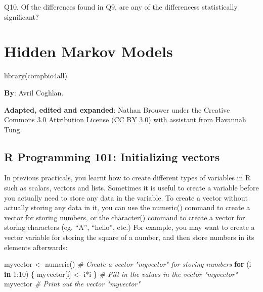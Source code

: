 \documentclass[
]{book}
\newenvironment{Shaded}{\begin{snugshade}}{\end{snugshade}}
\newcommand{\CommentTok}[1]{\textcolor[rgb]{0.56,0.35,0.01}{\textit{#1}}}
\newcommand{\ControlFlowTok}[1]{\textcolor[rgb]{0.13,0.29,0.53}{\textbf{#1}}}
\newcommand{\DecValTok}[1]{\textcolor[rgb]{0.00,0.00,0.81}{#1}}
\newcommand{\FunctionTok}[1]{\textcolor[rgb]{0.00,0.00,0.00}{#1}}
\newcommand{\NormalTok}[1]{#1}
\newcommand{\OtherTok}[1]{\textcolor[rgb]{0.56,0.35,0.01}{#1}}
\newcommand{\SpecialCharTok}[1]{\textcolor[rgb]{0.00,0.00,0.00}{#1}}
\begin{document}
Q10. Of the differences found in Q9, are any of the differencess statistically significant?

\hypertarget{hidden-markov-models}{%
\chapter{Hidden Markov Models}\label{hidden-markov-models}}

\begin{Shaded}
\begin{Highlighting}[]
\FunctionTok{library}\NormalTok{(compbio4all)}
\end{Highlighting}
\end{Shaded}

\textbf{By}: Avril Coghlan.

\textbf{Adapted, edited and expanded}: Nathan Brouwer under the Creative Commons 3.0 Attribution License \href{https://creativecommons.org/licenses/by/3.0/}{(CC BY 3.0)} with assistant from Havannah Tung.

\hypertarget{r-programming-101-initializing-vectors}{%
\section{R Programming 101: Initializing vectors}\label{r-programming-101-initializing-vectors}}

In previous practicals, you learnt how to create different types of variables in R such as scalars, vectors and lists. Sometimes it is useful to create a variable before you actually need to store any data in the variable. To create a vector without actually storing any data in it, you can use the numeric() command to create a vector for storing numbers, or the character() command to create a vector for storing characters (eg. ``A'', ``hello'', etc.) For example, you may want to create a vector variable for storing the square of a number, and then store numbers in its elements afterwards:

\begin{Shaded}
\begin{Highlighting}[]
\NormalTok{myvector }\OtherTok{\textless{}{-}} \FunctionTok{numeric}\NormalTok{()                  }\CommentTok{\# Create a vector "myvector" for storing numbers}
\ControlFlowTok{for}\NormalTok{ (i }\ControlFlowTok{in} \DecValTok{1}\SpecialCharTok{:}\DecValTok{10}\NormalTok{) \{ myvector[i] }\OtherTok{\textless{}{-}}\NormalTok{ i}\SpecialCharTok{*}\NormalTok{i \} }\CommentTok{\# Fill in the values in the vector "myvector"}
\NormalTok{myvector                               }\CommentTok{\# Print out the vector "myvector"}
\end{Highlighting}
\end{Shaded}
\end{document}
